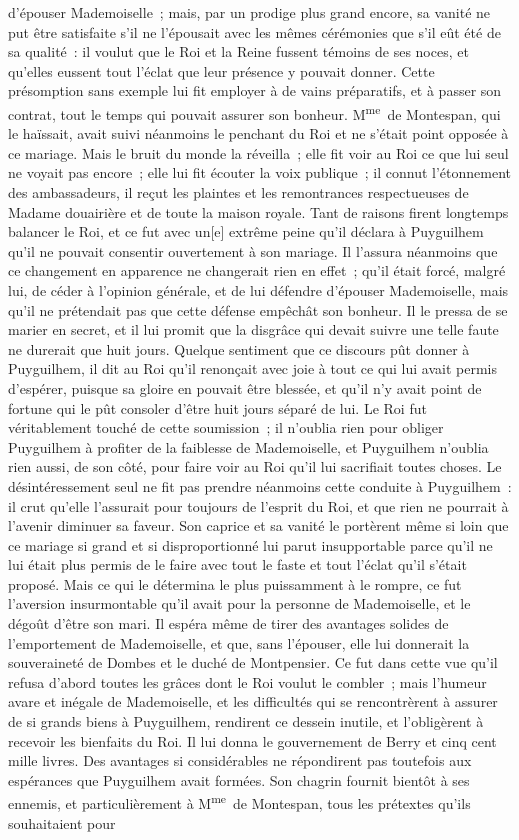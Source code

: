 \documentclass[french,twoside]{book} %
\begin{document}
d’épouser Mademoiselle ; mais, par un prodige plus grand encore, sa vanité ne put être satisfaite s’il ne l’épousait avec les mêmes cérémonies que s’il eût été de sa qualité : il voulut que le Roi et la Reine fussent témoins de ses noces, et qu’elles eussent tout l’éclat que leur présence y pouvait donner. Cette présomption sans exemple lui fit employer à de vains préparatifs, et à passer son contrat, tout le temps qui pouvait assurer son bonheur. M\textsuperscript{me} de Montespan, qui le haïssait, avait suivi néanmoins le penchant du Roi et ne s’était point opposée à ce mariage. Mais le bruit du monde la réveilla ; elle fit voir au Roi ce que lui seul ne voyait pas encore ; elle lui fit écouter la voix publique ; il connut l’étonnement des ambassadeurs, il reçut les plaintes et les remontrances respectueuses de Madame douairière et de toute la maison royale. Tant de raisons firent longtemps balancer le Roi, et ce fut avec un[e] extrême peine qu’il déclara à Puyguilhem qu’il ne pouvait consentir ouvertement à son mariage. Il l’assura néanmoins que ce changement en apparence ne changerait rien en effet ; qu’il était forcé, malgré lui, de céder à l’opinion générale, et de lui défendre d’épouser Mademoiselle, mais qu’il ne prétendait pas que cette défense empêchât son bonheur. Il le pressa de se marier en secret, et il lui promit que la disgrâce qui devait suivre une telle faute ne durerait que huit jours. Quelque sentiment que ce discours pût donner à Puyguilhem, il dit au Roi qu’il renonçait avec joie à tout ce qui lui avait permis d’espérer, puisque sa gloire en pouvait être blessée, et qu’il n’y avait point de fortune qui le pût consoler d’être huit jours séparé de lui. Le Roi fut véritablement touché de cette soumission ; il n’oublia rien pour obliger Puyguilhem à profiter de la faiblesse de Mademoiselle, et Puyguilhem n’oublia rien aussi, de son côté, pour faire voir au Roi qu’il lui sacrifiait toutes choses. Le désintéressement seul ne fit pas prendre néanmoins cette conduite à Puyguilhem : il crut qu’elle l’assurait pour toujours de l’esprit du Roi, et que rien ne pourrait à l’avenir diminuer sa faveur. Son caprice et sa vanité le portèrent même si loin que ce mariage si grand et si disproportionné lui parut insupportable parce qu’il ne lui était plus permis de le faire avec tout le faste et tout l’éclat qu’il s’était proposé. Mais ce qui le détermina le plus puissamment à le rompre, ce fut l’aversion insurmontable qu’il avait pour la personne de Mademoiselle, et le dégoût d’être son mari. Il espéra même de tirer des avantages solides de l’emportement de Mademoiselle, et que, sans l’épouser, elle lui donnerait la souveraineté de Dombes et le duché de Montpensier. Ce fut dans cette vue qu’il refusa d’abord toutes les grâces dont le Roi voulut le combler ; mais l’humeur avare et inégale de Mademoiselle, et les difficultés qui se rencontrèrent à assurer de si grands biens à Puyguilhem, rendirent ce dessein inutile, et l’obligèrent à recevoir les bienfaits du Roi. Il lui donna le gouvernement de Berry et cinq cent mille livres. Des avantages si considérables ne répondirent pas toutefois aux espérances que Puyguilhem avait formées. Son chagrin fournit bientôt à ses ennemis, et particulièrement à M\textsuperscript{me} de Montespan, tous les prétextes qu’ils souhaitaient pour 
\end{document}
